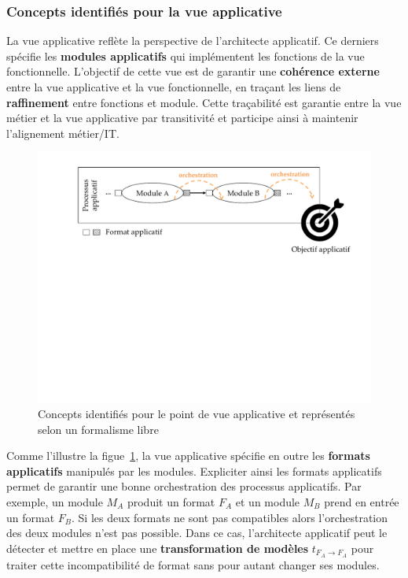     \subsubsection{Concepts identifiés pour la vue applicative}
    La vue applicative reflète la perspective de l'architecte applicatif. Ce derniers spécifie les \textbf{modules
    applicatifs} qui implémentent les fonctions de la vue fonctionnelle.
    L'objectif de cette vue est de garantir une \textbf{cohérence externe} entre la vue applicative et la vue fonctionnelle,
    en traçant les liens de \textbf{raffinement} entre fonctions et module. Cette
    traçabilité est garantie entre la vue métier et la vue applicative par transitivité et participe ainsi
    à maintenir l'alignement métier/IT.

    \begin{figure}[!ht]
     \begin{center}
     \includegraphics[trim= 0cm 11cm 0cm 0cm, width=1\textwidth]{figures/4_demarche/concepts_vue_applicative.pdf}
     \end{center}
     \caption{Concepts identifiés pour le point de vue applicative et représentés selon un formalisme libre}
     \label{fig:concepts_vue_applicative}
    \end{figure}

    Comme l'illustre la figue~\ref{fig:concepts_vue_applicative}, la vue applicative spécifie
    en outre les \textbf{formats applicatifs} manipulés par les modules. Expliciter
    ainsi les formats applicatifs permet de garantir une bonne orchestration des processus applicatifs. Par
    exemple, un module $M_{A}$ produit un format $F_{A}$ et
    un module $M_{B}$ prend en entrée un format $F_{B}$. Si les deux formats
    ne sont pas compatibles alors l'orchestration des deux modules n'est pas possible.
    Dans ce cas, l'architecte applicatif peut le détecter et mettre en place une \textbf{transformation de
    modèles} $t_{F_{A} \rightarrow F_{A}}$ pour traiter cette incompatibilité de format sans pour
    autant changer ses modules.

